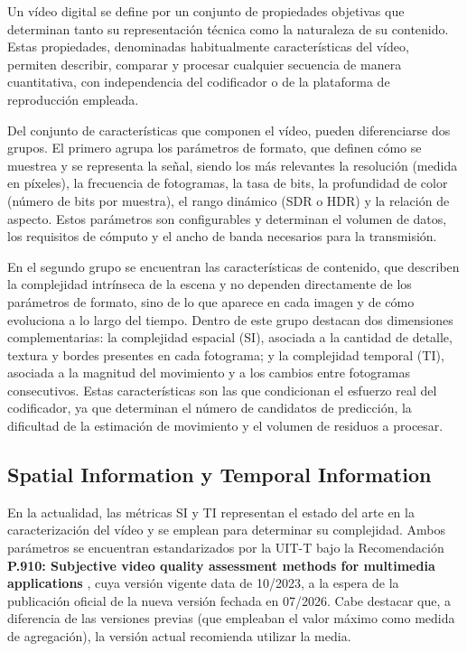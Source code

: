  Un vídeo digital se define por un conjunto de propiedades objetivas que determinan tanto su representación técnica como la naturaleza de su contenido. Estas propiedades, denominadas habitualmente características del vídeo, permiten describir, comparar y procesar cualquier secuencia de manera cuantitativa, con independencia del codificador o de la plataforma de reproducción empleada.

 Del conjunto de características que componen el vídeo, pueden diferenciarse dos grupos. El primero agrupa los parámetros de formato, que definen cómo se muestrea y se representa la señal, siendo los más relevantes la resolución (medida en píxeles), la frecuencia de fotogramas, la tasa de bits, la profundidad de color (número de bits por muestra), el rango dinámico (SDR o HDR) y la relación de aspecto. Estos parámetros son configurables y determinan el volumen de datos, los requisitos de cómputo y el ancho de banda necesarios para la transmisión.

 En el segundo grupo se encuentran las características de contenido, que describen la complejidad intrínseca de la escena y no dependen directamente de los parámetros de formato, sino de lo que aparece en cada imagen y de cómo evoluciona a lo largo del tiempo. Dentro de este grupo destacan dos dimensiones complementarias: la complejidad espacial (SI), asociada a la cantidad de detalle, textura y bordes presentes en cada fotograma; y la complejidad temporal (TI), asociada a la magnitud del movimiento y a los cambios entre fotogramas consecutivos. Estas características son las que condicionan el esfuerzo real del codificador, ya que determinan el número de candidatos de predicción, la dificultad de la estimación de movimiento y el volumen de residuos a procesar.

 \subsection{Spatial Information y Temporal Information}

 En la actualidad, las métricas SI y TI representan el estado del arte en la caracterización del vídeo y se emplean para determinar su complejidad. Ambos parámetros se encuentran estandarizados por la UIT-T bajo la Recomendación \textbf{P.910: Subjective video quality assessment methods for multimedia applications} \cite{itu-quality-metrics}, cuya versión vigente data de 10/2023, a la espera de la publicación oficial de la nueva versión fechada en 07/2026. Cabe destacar que, a diferencia de las versiones previas (que empleaban el valor máximo como medida de agregación), la versión actual recomienda utilizar la media.


